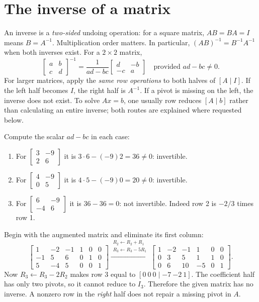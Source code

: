 \section{The inverse of a matrix}
An inverse is a \emph{two-sided} undoing operation: for a square matrix,
$AB=BA=I$ means $B=A^{-1}$. Multiplication order matters. In particular,
$(AB)^{-1}=B^{-1}A^{-1}$ when both inverses exist. For a $2\times2$ matrix,
\[
 \begin{bmatrix}a&b\\c&d\end{bmatrix}^{-1}
 =\frac1{ad-bc}\begin{bmatrix}d&-b\\-c&a\end{bmatrix}
 \quad\text{provided }ad-bc\ne0.
\]
For larger matrices, apply the \emph{same row operations} to both halves of
$[A\mid I]$. If the left half becomes $I$, the right half is $A^{-1}$.
If a pivot is missing on the left, the inverse does not exist. To solve
$Ax=b$, one usually row reduces $[A\mid b]$ rather than calculating an
entire inverse; both routes are explained where requested below.

Compute the scalar $ad-bc$ in each case:
\begin{enumerate}[label=(\alph*)]
\item For $\begin{bmatrix}3&-9\\2&6\end{bmatrix}$ it is
$3\cdot6-(-9)2=36\ne0$: invertible.
\item For $\begin{bmatrix}4&-9\\0&5\end{bmatrix}$ it is
$4\cdot5-(-9)0=20\ne0$: invertible.
\item For $\begin{bmatrix}6&-9\\-4&6\end{bmatrix}$ it is
$36-36=0$: not invertible. Indeed row 2 is $-2/3$ times row 1.
\end{enumerate}

Begin with the augmented matrix and eliminate its first column:
\[
 \left[\begin{array}{rrr|rrr}1&-2&-1&1&0&0\\-1&5&6&0&1&0\\5&-4&5&0&0&1\end{array}\right]
 \xrightarrow{\substack{R_2\gets R_2+R_1\\R_3\gets R_3-5R_1}}
 \left[\begin{array}{rrr|rrr}1&-2&-1&1&0&0\\0&3&5&1&1&0\\0&6&10&-5&0&1\end{array}\right].
\]
Now $R_3\gets R_3-2R_2$ makes row 3 equal to
$[0\ 0\ 0\mid-7\ {-2}\ 1]$. The coefficient half has only two pivots,
so it cannot reduce to $I_3$. Therefore the given matrix has no inverse.
A nonzero row in the \emph{right} half does not repair a missing pivot in $A$.

